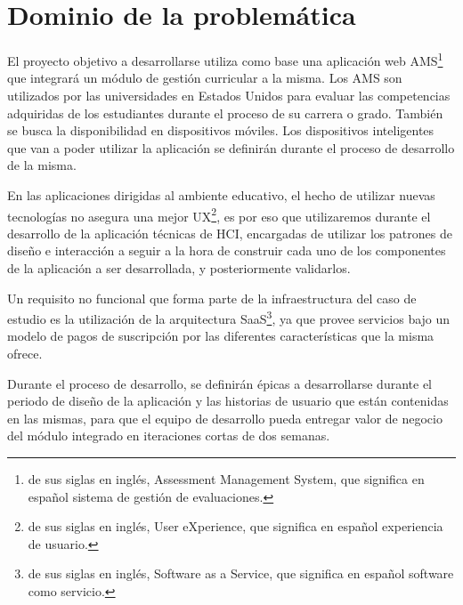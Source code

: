 \section{Dominio de la problemática}
El proyecto objetivo a desarrollarse utiliza como base una aplicación web AMS\footnote{de sus siglas en inglés, Assessment Management System, que significa en español sistema de gestión de evaluaciones.} que integrará un módulo de gestión curricular a la misma. Los AMS son utilizados por las universidades en Estados Unidos para evaluar las competencias adquiridas de los estudiantes durante el proceso de su carrera o grado. También se busca la disponibilidad en dispositivos móviles. Los dispositivos inteligentes que van a poder utilizar la aplicación se definirán durante el proceso de desarrollo de la misma.

En las aplicaciones dirigidas al ambiente educativo, el hecho de utilizar nuevas tecnologías no asegura una mejor UX\footnote{de sus siglas en inglés, User eXperience, que significa en español experiencia de usuario.}, es por eso que utilizaremos durante el desarrollo de la aplicación técnicas de HCI\citep{lazar_research_2010}, encargadas de utilizar los patrones de diseño e interacción a seguir a la hora de construir cada uno de los componentes de la aplicación a ser desarrollada, y posteriormente validarlos.

Un requisito no funcional que forma parte de la infraestructura del caso de estudio es la utilización de la arquitectura SaaS\footnote{de sus siglas en inglés, Software as a Service, que significa en español software como servicio.}, ya que provee servicios bajo un modelo de pagos de suscripción por las diferentes características que la misma ofrece.

Durante el proceso de desarrollo, se definirán épicas a desarrollarse durante el periodo de diseño de la aplicación y las historias de usuario que están contenidas en las mismas, para que el equipo de desarrollo pueda entregar valor de negocio del módulo integrado en iteraciones cortas de dos semanas.